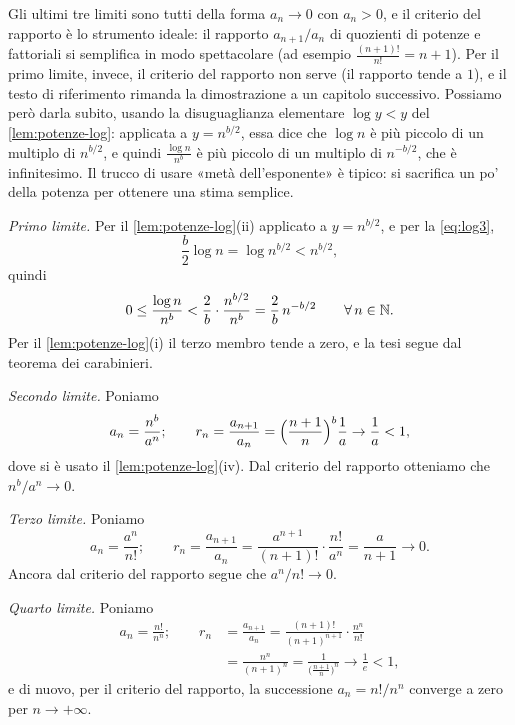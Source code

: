\begin{strategia}
Gli ultimi tre limiti sono tutti della forma $a_{n}\to0$ con $a_{n}>0$, e il criterio del
rapporto è lo strumento ideale: il rapporto $a_{n+1}/a_{n}$ di quozienti di potenze e
fattoriali si semplifica in modo spettacolare (ad esempio $\frac{(n+1)!}{n!}=n+1$). Per il
primo limite, invece, il criterio del rapporto non serve (il rapporto tende a $1$), e il
testo di riferimento \cite{marcellini-sbordone} rimanda la dimostrazione a un capitolo
successivo. Possiamo però darla subito, usando la disuguaglianza elementare $\log y<y$
del \cref{lem:potenze-log}: applicata a $y=n^{b/2}$, essa dice che $\log n$ è più piccolo
di un multiplo di $n^{b/2}$, e quindi $\frac{\log n}{n^{b}}$ è più piccolo di un multiplo di
$n^{-b/2}$, che è infinitesimo. Il trucco di usare «metà dell'esponente» è tipico: si
sacrifica un po' della potenza per ottenere una stima semplice.
\end{strategia}

\begin{dimostrazione}
\emph{Primo limite.} Per il \cref{lem:potenze-log}(ii) applicato a $y=n^{b/2}$, e per la
\eqref{eq:log3},
\[
  \frac b2\log n=\log n^{b/2}<n^{b/2},
\]
quindi
\[
  0\le\frac{\log n}{n^{b}}<\frac2b\cdot\frac{n^{b/2}}{n^{b}}=\frac2b\,n^{-b/2}
  \qquad\forall\, n\in\mathbb{N} .
\]
Per il \cref{lem:potenze-log}(i) il terzo membro tende a zero, e la tesi segue dal
teorema dei carabinieri.

\emph{Secondo limite.} Poniamo
\begin{equation}\label{eq:gerarchia-2}
  a_{n}=\frac{n^{b}}{a^{n}}; \qquad
  r_{n}=\frac{a_{n+1}}{a_{n}}=\Bigl(\frac{n+1}{n}\Bigr)^{b}\frac1a\to\frac1a<1,
\end{equation}
dove si è usato il \cref{lem:potenze-log}(iv). Dal criterio del rapporto otteniamo che
$n^{b}/a^{n}\to0$.

\emph{Terzo limite.} Poniamo
\begin{equation}\label{eq:gerarchia-3}
  a_{n}=\frac{a^{n}}{n!}; \qquad r_{n}=\frac{a_{n+1}}{a_{n}}=\frac{a^{n+1}}{(n+1)!}\cdot\frac{n!}{a^{n}}=\frac{a}{n+1}\to0 .
\end{equation}
Ancora dal criterio del rapporto segue che $a^{n}/n!\to0$.

\emph{Quarto limite.} Poniamo
\begin{equation}\label{eq:gerarchia-4}
\begin{split}
  a_{n}=\frac{n!}{n^{n}}; \qquad
  r_{n}&=\frac{a_{n+1}}{a_{n}}=\frac{(n+1)!}{(n+1)^{n+1}}\cdot\frac{n^{n}}{n!}\\
  &=\frac{n^{n}}{(n+1)^{n}}=\frac{1}{\bigl(\frac{n+1}{n}\bigr)^{n}}\to\frac1e<1,
\end{split}
\end{equation}
e di nuovo, per il criterio del rapporto, la successione $a_{n}=n!/n^{n}$ converge a zero
per $n\to+\infty$.
\end{dimostrazione}

